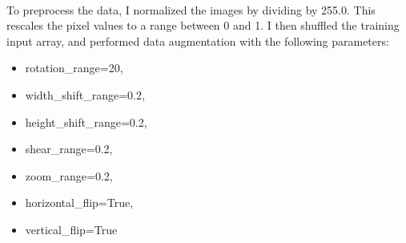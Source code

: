 \documentclass[11pt]{article}
\begin{document}
\\
To preprocess the data, I normalized the images by dividing by 255.0. This rescales the pixel values to a range between 0 and 1. I then shuffled the training input array, and performed data augmentation with the following parameters:\\
\begin{itemize}
    \item rotation\_range=20,
    \item width\_shift\_range=0.2,
    \item height\_shift\_range=0.2,
    \item shear\_range=0.2,
    \item zoom\_range=0.2,
    \item horizontal\_flip=True,
    \item vertical\_flip=True
\end{itemize}
\end{document}
